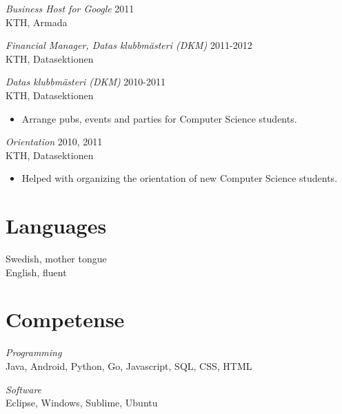 \documentclass[margin, 10pt]{res} %
\begin{document}
\begin{resume}
{\sl Business Host for Google} \hfill 2011 \\
KTH, Armada

{\sl Financial Manager, Datas klubbmästeri (DKM)} \hfill 2011-2012 \\
KTH, Datasektionen

{\sl Datas klubbmästeri (DKM)} \hfill 2010-2011 \\
KTH, Datasektionen
\begin{itemize} 
\item Arrange pubs, events and parties for Computer Science students.
\end{itemize}

{\sl Orientation} \hfill 2010, 2011 \\
KTH, Datasektionen
\begin{itemize} 
\item Helped with organizing the orientation of new Computer Science students.
\end{itemize}


\section{Languages}
Swedish, mother tongue \\
English, fluent


\section{Competense}
{\sl Programming} \\
Java, Android, Python, Go, Javascript, SQL, CSS, HTML

{\sl Software} \\
Eclipse, Windows, Sublime, Ubuntu


\end{resume}
\end{document}
